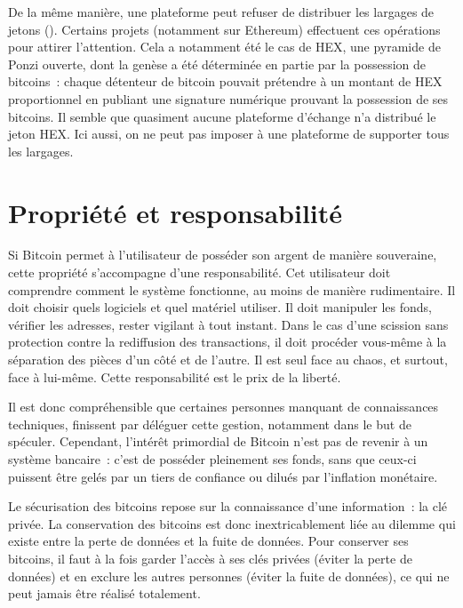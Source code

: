 De la même manière, une plateforme peut refuser de distribuer les largages de jetons (). Certains projets (notamment sur Ethereum) effectuent ces opérations pour attirer l'attention. Cela a notamment été le cas de HEX, une pyramide de Ponzi ouverte, dont la genèse a été déterminée en partie par la possession de bitcoins~: chaque détenteur de bitcoin pouvait prétendre à un montant de HEX proportionnel en publiant une signature numérique prouvant la possession de ses bitcoins. Il semble que quasiment aucune plateforme d'échange n'a distribué le jeton HEX. Ici aussi, on ne peut pas imposer à une plateforme de supporter tous les largages. 

\section*{Propriété et responsabilité}

Si Bitcoin permet à l'utilisateur de posséder son argent de manière souveraine, cette propriété s'accompagne d'une responsabilité. Cet utilisateur doit comprendre comment le système fonctionne, au moins de manière rudimentaire. Il doit choisir quels logiciels et quel matériel utiliser. Il doit manipuler les fonds, vérifier les adresses, rester vigilant à tout instant. Dans le cas d'une scission sans protection contre la rediffusion des transactions, il doit procéder vous-même à la séparation des pièces d'un côté et de l'autre. Il est seul face au chaos, et surtout, face à lui-même. Cette responsabilité est le prix de la liberté.

Il est donc compréhensible que certaines personnes manquant de connaissances techniques, finissent par déléguer cette gestion, notamment dans le but de spéculer. Cependant, l'intérêt primordial de Bitcoin n'est pas de revenir à un système bancaire~: c'est de posséder pleinement ses fonds, sans que ceux-ci puissent être gelés par un tiers de confiance ou dilués par l'inflation monétaire. 

Le sécurisation des bitcoins repose sur la connaissance d'une information~: la clé privée. La conservation des bitcoins est donc inextricablement liée au dilemme qui existe entre la perte de données et la fuite de données. Pour conserver ses bitcoins, il faut à la fois garder l'accès à ses clés privées (éviter la perte de données) et en exclure les autres personnes (éviter la fuite de données), ce qui ne peut jamais être réalisé totalement.

